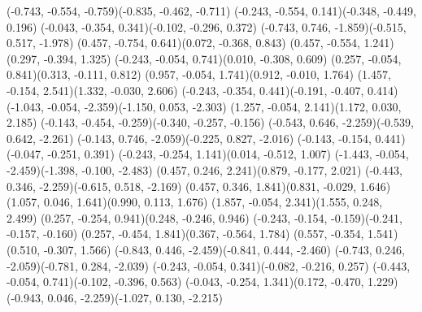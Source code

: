 \pstThreeDLine[linecolor=gray](-0.743, -0.554, -0.759)(-0.835, -0.462, -0.711)
\pstThreeDLine[linecolor=gray](-0.243, -0.554, 0.141)(-0.348, -0.449, 0.196)
\pstThreeDLine[linecolor=gray](-0.043, -0.354, 0.341)(-0.102, -0.296, 0.372)
\pstThreeDLine[linecolor=black](-0.743, 0.746, -1.859)(-0.515, 0.517, -1.978)
\pstThreeDLine[linecolor=gray](0.457, -0.754, 0.641)(0.072, -0.368, 0.843)
\pstThreeDLine[linecolor=gray](0.457, -0.554, 1.241)(0.297, -0.394, 1.325)
\pstThreeDLine[linecolor=black](-0.243, -0.054, 0.741)(0.010, -0.308, 0.609)
\pstThreeDLine[linecolor=black](0.257, -0.054, 0.841)(0.313, -0.111, 0.812)
\pstThreeDLine[linecolor=gray](0.957, -0.054, 1.741)(0.912, -0.010, 1.764)
\pstThreeDLine[linecolor=gray](1.457, -0.154, 2.541)(1.332, -0.030, 2.606)
\pstThreeDLine[linecolor=black](-0.243, -0.354, 0.441)(-0.191, -0.407, 0.414)
\pstThreeDLine[linecolor=gray](-1.043, -0.054, -2.359)(-1.150, 0.053, -2.303)
\pstThreeDLine[linecolor=gray](1.257, -0.054, 2.141)(1.172, 0.030, 2.185)
\pstThreeDLine[linecolor=gray](-0.143, -0.454, -0.259)(-0.340, -0.257, -0.156)
\pstThreeDLine[linecolor=gray](-0.543, 0.646, -2.259)(-0.539, 0.642, -2.261)
\pstThreeDLine[linecolor=gray](-0.143, 0.746, -2.059)(-0.225, 0.827, -2.016)
\pstThreeDLine[linecolor=black](-0.143, -0.154, 0.441)(-0.047, -0.251, 0.391)
\pstThreeDLine[linecolor=black](-0.243, -0.254, 1.141)(0.014, -0.512, 1.007)
\pstThreeDLine[linecolor=black](-1.443, -0.054, -2.459)(-1.398, -0.100, -2.483)
\pstThreeDLine[linecolor=black](0.457, 0.246, 2.241)(0.879, -0.177, 2.021)
\pstThreeDLine[linecolor=gray](-0.443, 0.346, -2.259)(-0.615, 0.518, -2.169)
\pstThreeDLine[linecolor=black](0.457, 0.346, 1.841)(0.831, -0.029, 1.646)
\pstThreeDLine[linecolor=gray](1.057, 0.046, 1.641)(0.990, 0.113, 1.676)
\pstThreeDLine[linecolor=gray](1.857, -0.054, 2.341)(1.555, 0.248, 2.499)
\pstThreeDLine[linecolor=gray](0.257, -0.254, 0.941)(0.248, -0.246, 0.946)
\pstThreeDLine[linecolor=black](-0.243, -0.154, -0.159)(-0.241, -0.157, -0.160)
\pstThreeDLine[linecolor=black](0.257, -0.454, 1.841)(0.367, -0.564, 1.784)
\pstThreeDLine[linecolor=gray](0.557, -0.354, 1.541)(0.510, -0.307, 1.566)
\pstThreeDLine[linecolor=gray](-0.843, 0.446, -2.459)(-0.841, 0.444, -2.460)
\pstThreeDLine[linecolor=gray](-0.743, 0.246, -2.059)(-0.781, 0.284, -2.039)
\pstThreeDLine[linecolor=black](-0.243, -0.054, 0.341)(-0.082, -0.216, 0.257)
\pstThreeDLine[linecolor=black](-0.443, -0.054, 0.741)(-0.102, -0.396, 0.563)
\pstThreeDLine[linecolor=black](-0.043, -0.254, 1.341)(0.172, -0.470, 1.229)
\pstThreeDLine[linecolor=gray](-0.943, 0.046, -2.259)(-1.027, 0.130, -2.215)
